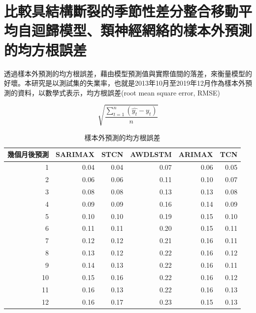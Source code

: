 \documentclass[oneside]{book}
\begin{document}
\hypertarget{ux6bd4ux8f03ux5177ux7d50ux69cbux65b7ux88c2ux7684ux5b63ux7bc0ux6027ux5deeux5206ux6574ux5408ux79fbux52d5ux5e73ux5747ux81eaux8ff4ux6b78ux6a21ux578bux985eux795eux7d93ux7db2ux7d61ux7684ux6a23ux672cux5916ux9810ux6e2cux7684ux5747ux65b9ux6839ux8aa4ux5dee}{%
\section{比較具結構斷裂的季節性差分整合移動平均自迴歸模型、類神經網絡的樣本外預測的均方根誤差}\label{ux6bd4ux8f03ux5177ux7d50ux69cbux65b7ux88c2ux7684ux5b63ux7bc0ux6027ux5deeux5206ux6574ux5408ux79fbux52d5ux5e73ux5747ux81eaux8ff4ux6b78ux6a21ux578bux985eux795eux7d93ux7db2ux7d61ux7684ux6a23ux672cux5916ux9810ux6e2cux7684ux5747ux65b9ux6839ux8aa4ux5dee}}

透過樣本外預測的均方根誤差，藉由模型預測值與實際值間的落差，來衡量模型的好壞。本研究是以測試集的失業率，也就是2013年10月至2019年12月作為樣本外預測的資料，以數學式表示，均方根誤差(root mean square error, RMSE)

\[\sqrt{\frac{\sum_{t=1}^n(\hat{y_t}-y_t)}{n}}\]

\begin{table}

\caption{\label{tab:RMSE}樣本外預測的均方根誤差}
\centering
\begin{tabular}[t]{r|r|r|r|r|r}
\hline
幾個月後預測 & SARIMAX & STCN & AWDLSTM & ARIMAX & TCN\\
\hline
1 & 0.04 & 0.04 & 0.07 & 0.06 & 0.05\\
\hline
2 & 0.06 & 0.06 & 0.11 & 0.10 & 0.07\\
\hline
3 & 0.08 & 0.08 & 0.13 & 0.13 & 0.08\\
\hline
4 & 0.09 & 0.09 & 0.16 & 0.14 & 0.09\\
\hline
5 & 0.10 & 0.10 & 0.19 & 0.15 & 0.10\\
\hline
6 & 0.11 & 0.11 & 0.20 & 0.15 & 0.11\\
\hline
7 & 0.12 & 0.12 & 0.21 & 0.16 & 0.11\\
\hline
8 & 0.13 & 0.12 & 0.22 & 0.16 & 0.12\\
\hline
9 & 0.14 & 0.13 & 0.22 & 0.16 & 0.11\\
\hline
10 & 0.15 & 0.16 & 0.22 & 0.16 & 0.12\\
\hline
11 & 0.16 & 0.13 & 0.22 & 0.16 & 0.13\\
\hline
12 & 0.16 & 0.17 & 0.23 & 0.15 & 0.13\\
\hline
\end{tabular}
\end{table}
\end{document}
